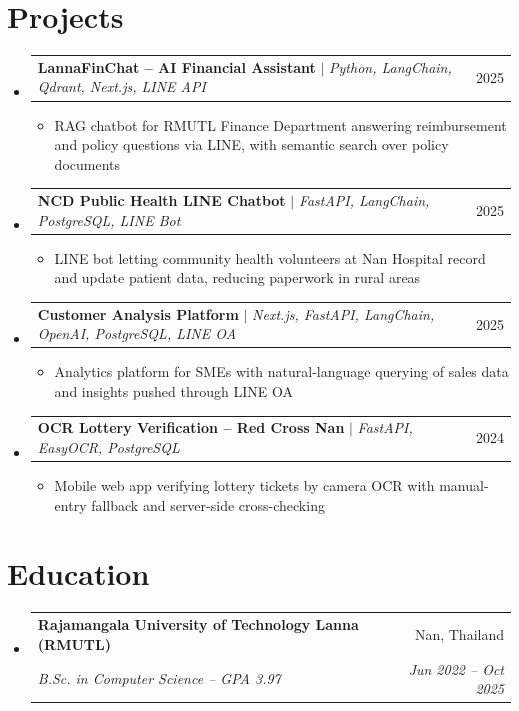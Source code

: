 \documentclass[11pt]{article}
\makeatletter
\newcommand{\resumeItem}[1]{\item\small{{#1 \vspace{-2pt}}}}
\newcommand{\resumeSubheading}[4]{
  \vspace{-2pt}\item
    \begin{tabular*}{\linewidth}[t]{l@{\extracolsep{\fill}}r}
      \textbf{#1} & #2 \\
      \textit{\small#3} & \textit{\small #4} \\
    \end{tabular*}\vspace{-7pt}
}
\newcommand{\resumeProjectHeading}[2]{
    \item
    \begin{tabular*}{\linewidth}{l@{\extracolsep{\fill}}r}
      \small#1 & #2 \\
    \end{tabular*}\vspace{-7pt}
}
\newcommand{\resumeSubHeadingListStart}{\begin{itemize}[leftmargin=0.15in, label={}]}
\newcommand{\resumeSubHeadingListEnd}{\end{itemize}}
\newcommand{\resumeItemListStart}{\begin{itemize}[leftmargin=0.18in, itemsep=0pt]}
\newcommand{\resumeItemListEnd}{\end{itemize}\vspace{-5pt}}
\makeatother
\begin{document}
\section{Projects}
    \resumeSubHeadingListStart
      \resumeProjectHeading
          {\textbf{LannaFinChat -- AI Financial Assistant} $|$ \emph{Python, LangChain, Qdrant, Next.js, LINE API}}{2025}
          \resumeItemListStart
            \resumeItem{RAG chatbot for RMUTL Finance Department answering reimbursement and policy questions via LINE, with semantic search over policy documents}
          \resumeItemListEnd
      \resumeProjectHeading
          {\textbf{NCD Public Health LINE Chatbot} $|$ \emph{FastAPI, LangChain, PostgreSQL, LINE Bot}}{2025}
          \resumeItemListStart
            \resumeItem{LINE bot letting community health volunteers at Nan Hospital record and update patient data, reducing paperwork in rural areas}
          \resumeItemListEnd
      \resumeProjectHeading
          {\textbf{Customer Analysis Platform} $|$ \emph{Next.js, FastAPI, LangChain, OpenAI, PostgreSQL, LINE OA}}{2025}
          \resumeItemListStart
            \resumeItem{Analytics platform for SMEs with natural-language querying of sales data and insights pushed through LINE OA}
          \resumeItemListEnd
      \resumeProjectHeading
          {\textbf{OCR Lottery Verification -- Red Cross Nan} $|$ \emph{FastAPI, EasyOCR, PostgreSQL}}{2024}
          \resumeItemListStart
            \resumeItem{Mobile web app verifying lottery tickets by camera OCR with manual-entry fallback and server-side cross-checking}
          \resumeItemListEnd
    \resumeSubHeadingListEnd

\section{Education}
  \resumeSubHeadingListStart
    \resumeSubheading
      {Rajamangala University of Technology Lanna (RMUTL)}{Nan, Thailand}
      {B.Sc. in Computer Science -- GPA 3.97}{Jun 2022 -- Oct 2025}
  \resumeSubHeadingListEnd

\end{document}
